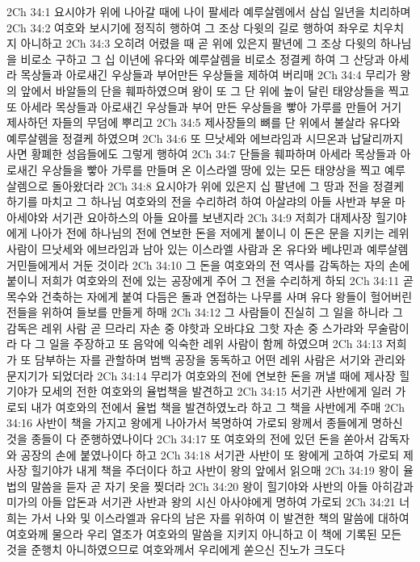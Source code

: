 2Ch 34:1  요시야가 위에 나아갈 때에 나이 팔세라 예루살렘에서 삼십 일년을 치리하며
2Ch 34:2  여호와 보시기에 정직히 행하여 그 조상 다윗의 길로 행하여 좌우로 치우치지 아니하고
2Ch 34:3  오히려 어렸을 때 곧 위에 있은지 팔년에 그 조상 다윗의 하나님을 비로소 구하고 그 십 이년에 유다와 예루살렘을 비로소 정결케 하여 그 산당과 아세라 목상들과 아로새긴 우상들과 부어만든 우상들을 제하여 버리매
2Ch 34:4  무리가 왕의 앞에서 바알들의 단을 훼파하였으며 왕이 또 그 단 위에 높이 달린 태양상들을 찍고 또 아세라 목상들과 아로새긴 우상들과 부어 만든 우상들을 빻아 가루를 만들어 거기 제사하던 자들의 무덤에 뿌리고
2Ch 34:5  제사장들의 뼈를 단 위에서 불살라 유다와 예루살렘을 정결케 하였으며
2Ch 34:6  또 므낫세와 에브라임과 시므온과 납달리까지 사면 황폐한 성읍들에도 그렇게 행하여
2Ch 34:7  단들을 훼파하며 아세라 목상들과 아로새긴 우상들을 빻아 가루를 만들며 온 이스라엘 땅에 있는 모든 태양상을 찍고 예루살렘으로 돌아왔더라
2Ch 34:8  요시야가 위에 있은지 십 팔년에 그 땅과 전을 정결케 하기를 마치고 그 하나님 여호와의 전을 수리하려 하여 아살랴의 아들 사반과 부윤 마아세야와 서기관 요아하스의 아들 요아를 보낸지라
2Ch 34:9  저희가 대제사장 힐기야에게 나아가 전에 하나님의 전에 연보한 돈을 저에게 붙이니 이 돈은 문을 지키는 레위 사람이 므낫세와 에브라임과 남아 있는 이스라엘 사람과 온 유다와 베냐민과 예루살렘 거민들에게서 거둔 것이라
2Ch 34:10  그 돈을 여호와의 전 역사를 감독하는 자의 손에 붙이니 저희가 여호와의 전에 있는 공장에게 주어 그 전을 수리하게 하되
2Ch 34:11  곧 목수와 건축하는 자에게 붙여 다듬은 돌과 연접하는 나무를 사며 유다 왕들이 헐어버린 전들을 위하여 들보를 만들게 하매
2Ch 34:12  그 사람들이 진실히 그 일을 하니라 그 감독은 레위 사람 곧 므라리 자손 중 야핫과 오바댜요 그핫 자손 중 스가랴와 무술람이라 다 그 일을 주장하고 또 음악에 익숙한 레위 사람이 함께 하였으며
2Ch 34:13  저희가 또 담부하는 자를 관할하며 범백 공장을 동독하고 어떤 레위 사람은 서기와 관리와 문지기가 되었더라
2Ch 34:14  무리가 여호와의 전에 연보한 돈을 꺼낼 때에 제사장 힐기야가 모세의 전한 여호와의 율법책을 발견하고
2Ch 34:15  서기관 사반에게 일러 가로되 내가 여호와의 전에서 율법 책을 발견하였노라 하고 그 책을 사반에게 주매
2Ch 34:16  사반이 책을 가지고 왕에게 나아가서 복명하여 가로되 왕께서 종들에게 명하신 것을 종들이 다 준행하였나이다
2Ch 34:17  또 여호와의 전에 있던 돈을 쏟아서 감독자와 공장의 손에 붙였나이다 하고
2Ch 34:18  서기관 사반이 또 왕에게 고하여 가로되 제사장 힐기야가 내게 책을 주더이다 하고 사반이 왕의 앞에서 읽으매
2Ch 34:19  왕이 율법의 말씀을 듣자 곧 자기 옷을 찢더라
2Ch 34:20  왕이 힐기야와 사반의 아들 아히감과 미가의 아들 압돈과 서기관 사반과 왕의 시신 아사야에게 명하여 가로되
2Ch 34:21  너희는 가서 나와 및 이스라엘과 유다의 남은 자를 위하여 이 발견한 책의 말씀에 대하여 여호와께 물으라 우리 열조가 여호와의 말씀을 지키지 아니하고 이 책에 기록된 모든 것을 준행치 아니하였으므로 여호와께서 우리에게 쏟으신 진노가 크도다
